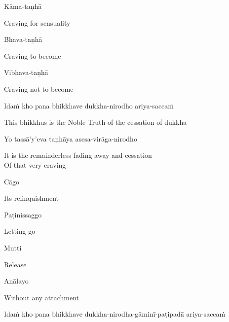Kāma-taṇhā

\begin{english}
  Craving for sensuality
\end{english}

\ifninebythirteen\clearpage\fi

Bhava-taṇhā

\begin{english}
  Craving to become
\end{english}

Vibhava-taṇhā

\begin{english}
  Craving not to become
\end{english}

\begin{pali-hang}
Idaṁ kho pana bhikkhave dukkha-nirodho ariya-saccaṁ
\end{pali-hang}

\begin{english-hang}
  This bhikkhus is the Noble Truth of the cessation of dukkha
\end{english-hang}

Yo tassā'y'eva taṇhāya asesa-virāga-nirodho

\begin{english}
  It is the remainderless fading away and cessation\\
  Of that very craving
\end{english}

Cāgo

\begin{english}
  Its relinquishment
\end{english}

Paṭinissaggo

\begin{english}
  Letting go
\end{english}

Mutti

\begin{english}
  Release
\end{english}

Anālayo

\begin{english}
  Without any attachment
\end{english}

\ifninebythirteen\clearpage\fi

\begin{pali-hang}
  Idaṁ kho pana bhikkhave dukkha-nirodha-gāminī-paṭipadā ariya-saccaṁ
\end{pali-hang}

